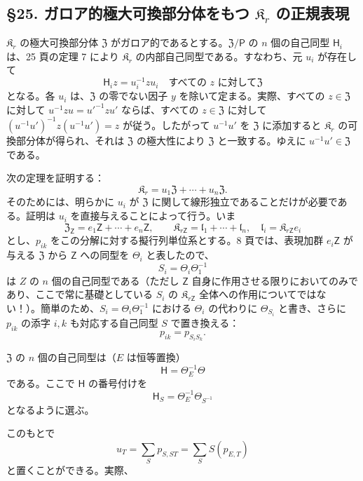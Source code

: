\subsection*{\S 25. ガロア的極大可換部分体をもつ \(\mathfrak K_r\) の正規表現\protect\footnotemark}
\label{normaldarstellung-von-r_r-mit-galoisschem-maximalem-kommutativem-teilkoerper-1}

\(\mathfrak K_r\) の極大可換部分体 \(\mathfrak Z\) がガロア的であるとする。\(\mathfrak Z/\mathsf P\) の \(n\) 個の自己同型 \(\mathsf{H}_i\) は、25 頁の定理 7 により \(\mathfrak K_r\) の内部自己同型である。すなわち、元 \(u_i\) が存在して
\[
\mathsf{H}_i z=u_i^{-1}zu_i\quad\text{すべての }z\text{ に対して}\mathfrak Z
\]
となる。各 \(u_i\) は、\(\mathfrak Z\) の零でない因子 \(y\) を除いて定まる。実際、すべての \(z\in\mathfrak Z\) に対して \(u^{-1}zu=u'^{-1}zu'\) ならば、すべての \(z\in\mathfrak Z\) に対して \((u^{-1}u')^{-1}z(u^{-1}u')=z\) が従う。したがって \(u^{-1}u'\) を \(\mathfrak Z\) に添加すると \(\mathfrak K_r\) の可換部分体が得られ、それは \(\mathfrak Z\) の極大性により \(\mathfrak Z\) と一致する。ゆえに \(u^{-1}u'\in\mathfrak Z\) である。

次の定理を証明する：
\[
\mathfrak K_r=u_1\mathfrak Z+\cdots+u_n\mathfrak Z.
\]
そのためには、明らかに \(u_i\) が \(\mathfrak Z\) に関して線形独立であることだけが必要である。証明は \(u_i\) を直接与えることによって行う。いま
\[
\mathfrak Z_{\mathsf{Z}}=e_1\mathsf{Z}+\cdots+e_n\mathsf{Z},\qquad
\mathfrak K_{r\mathsf{Z}}=\mathfrak l_1+\cdots+\mathfrak l_n,\quad
\mathfrak l_i=\mathfrak K_{r\mathsf{Z}}e_i
\]
とし、\(p_{ik}\) をこの分解に対する擬行列単位系とする。8 頁では、表現加群 \(e_i\mathsf{Z}\) が与える \(\mathfrak Z\) から \(\mathsf{Z}\) への同型を \(\Theta_i\) と表したので、
\[
S_i=\Theta_i\Theta_1^{-1}
\]
は \(Z\) の \(n\) 個の自己同型である（ただし \(\mathsf{Z}\) 自身に作用させる限りにおいてのみであり、ここで常に基礎としている \(S_i\) の \(\mathfrak K_{r\mathsf{Z}}\) 全体への作用についてではない！）。簡単のため、\(S_i=\Theta_i\Theta_1^{-1}\) における \(\Theta_i\) の代わりに \(\Theta_{S_i}\) と書き、さらに \(p_{ik}\) の添字 \(i,k\) も対応する自己同型 \(S\) で置き換える：
\[
p_{ik}=p_{S_iS_k}.
\]

\(\mathfrak Z\) の \(n\) 個の自己同型は（\(E\) は恒等置換）
\[
\mathsf{H}=\Theta_E^{-1}\Theta
\]
である。ここで \(\mathsf{H}\) の番号付けを
\[
\mathsf{H}_S=\Theta_E^{-1}\Theta_{S^{-1}}
\]
となるように選ぶ。

このもとで
\[
u_T=\sum_S p_{S,ST}=\sum_S S(p_{E,T})
\]
と置くことができる。実際、

